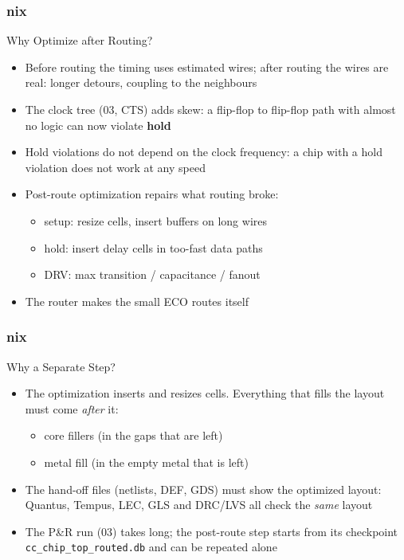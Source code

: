 \documentclass{beamer}
\newcommand{\astitle}{nix}
\newcommand{\assubtitle}{nix}
\newcommand{\cmd}[1]{\texttt{#1}}
\begin{document}
\renewcommand{\assubtitle}{Why Optimize after Routing?}
\begin{frame}
\frametitle{\astitle}
\begin{block}{\assubtitle}
  \begin{itemize}
    \item Before routing the timing uses estimated wires; after routing
      the wires are real: longer detours, coupling to the neighbours
    \item The clock tree (03, CTS) adds skew: a flip-flop to flip-flop
      path with almost no logic can now violate \textbf{hold}
    \item Hold violations do not depend on the clock frequency: a chip
      with a hold violation does not work at any speed
    \item Post-route optimization repairs what routing broke:
    \begin{itemize}
      \item setup: resize cells, insert buffers on long wires
      \item hold: insert delay cells in too-fast data paths
      \item DRV: max transition / capacitance / fanout
    \end{itemize}
    \item The router makes the small ECO routes itself
  \end{itemize}
\end{block}
\end{frame}

\renewcommand{\assubtitle}{Why a Separate Step?}
\begin{frame}
\frametitle{\astitle}
\begin{block}{\assubtitle}
  \begin{itemize}
    \item The optimization inserts and resizes cells. Everything that
      fills the layout must come \emph{after} it:
    \begin{itemize}
      \item core fillers (in the gaps that are left)
      \item metal fill (in the empty metal that is left)
    \end{itemize}
    \item The hand-off files (netlists, DEF, GDS) must show the
      optimized layout: Quantus, Tempus, LEC, GLS and DRC/LVS all check
      the \emph{same} layout
    \item The P\&R run (03) takes long; the post-route step starts from
      its checkpoint \cmd{cc\_chip\_top\_routed.db} and can be repeated
      alone
  \end{itemize}
\end{block}
\end{frame}
\end{document}
